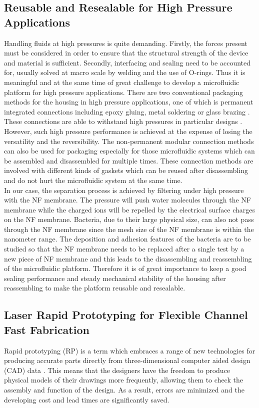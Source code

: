 \subsection{Reusable and Resealable for High Pressure Applications}
\label{1_1_2}
Handling fluids at high pressures is quite demanding. Firstly, the forces present must be considered in order to ensure that the structural strength of the device and material is sufficient. Secondly, interfacing and sealing need to be accounted for, usually solved at macro scale by welding and the use of O-rings. Thus it is meaningful and at the same time of great challenge to develop a microfluidic platform for high pressure applications. There are two conventional packaging methods for the housing in high pressure applications, one of which is permanent integrated connections including epoxy gluing, metal soldering or glass brazing \cite{marre2010design}. These connections are able to withstand high pressures in particular designs \cite{blom2001local}. However, such high pressure performance is achieved at the expense of losing the versatility and the reversibility. The non-permanent modular connection methods can also be used for packaging especially for those microfluidic systems which can be assembled and disassembled for multiple times. These connection methods are involved with different kinds of gaskets which can be reused after disassembling and do not hurt the microfluidic system at the same time.\\

In our case, the separation process is achieved by filtering under high pressure with the NF membrane. The pressure will push water molecules through the NF membrane while the charged ions will be repelled by the electrical surface charges on the NF membrane. Bacteria, due to their large physical size, can also not pass through the NF membrane since the mesh size of the NF membrane is within the nanometer range. The deposition and adhesion features of the bacteria are to be studied so that the NF membrane needs to be replaced after a single test by a new piece of NF membrane and this leads to the disassembling and reassembling of the microfluidic platform. Therefore it is of great importance to keep a good sealing performance and steady mechanical stability of the housing after reassembling to make the platform reusable and resealable. 


\subsection{Laser Rapid Prototyping for Flexible Channel Fast Fabrication}
\label{1_1_3}
Rapid prototyping (RP) is a term which embraces a range of new technologies for producing accurate parts directly from three-dimensional computer aided design (CAD) data \cite{pham1998comparison}. This means that the designers have the freedom to produce physical models of their drawings more frequently, allowing them to check the assembly and function of the design. As a result, errors are minimized and the developing cost and lead times are significantly saved. \\

